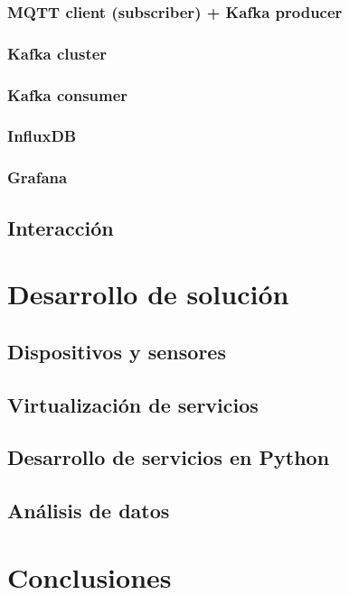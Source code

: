 \documentclass[12pt, a4paper]{article}
\begin{document}
        \subsubsection{MQTT client (subscriber) + Kafka producer}
        \subsubsection{Kafka cluster}
        \subsubsection{Kafka consumer}
        \subsubsection{InfluxDB}
        \subsubsection{Grafana}

        \subsection{Interacción}
        


        \section{Desarrollo de solución}

        \subsection{Dispositivos y sensores}

        \subsection{Virtualización de servicios}
        
        \subsection{Desarrollo de servicios en Python}
        
        \subsection{Análisis de datos}
        
        \section{Conclusiones}

\end{document}

